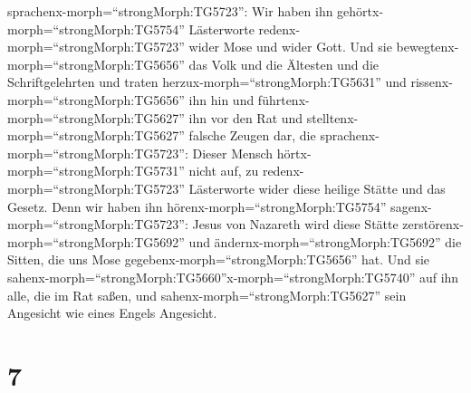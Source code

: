 sprachenx-morph=``strongMorph:TG5723'': Wir haben ihn
gehörtx-morph=``strongMorph:TG5754'' Lästerworte
redenx-morph=``strongMorph:TG5723'' wider Mose und wider Gott.
 Und sie bewegtenx-morph=``strongMorph:TG5656'' das Volk
und die Ältesten und die Schriftgelehrten und traten
herzux-morph=``strongMorph:TG5631'' und
rissenx-morph=``strongMorph:TG5656'' ihn hin und
führtenx-morph=``strongMorph:TG5627'' ihn vor den Rat  und
stelltenx-morph=``strongMorph:TG5627'' falsche Zeugen dar, die
sprachenx-morph=``strongMorph:TG5723'': Dieser Mensch
hörtx-morph=``strongMorph:TG5731'' nicht auf, zu
redenx-morph=``strongMorph:TG5723'' Lästerworte wider diese heilige
Stätte und das Gesetz.  Denn wir haben ihn
hörenx-morph=``strongMorph:TG5754'' sagenx-morph=``strongMorph:TG5723'':
Jesus von Nazareth wird diese Stätte
zerstörenx-morph=``strongMorph:TG5692'' und
ändernx-morph=``strongMorph:TG5692'' die Sitten, die uns Mose
gegebenx-morph=``strongMorph:TG5656'' hat.  Und sie
sahenx-morph=``strongMorph:TG5660''x-morph=``strongMorph:TG5740'' auf
ihn alle, die im Rat saßen, und sahenx-morph=``strongMorph:TG5627'' sein
Angesicht wie eines Engels Angesicht.

\hypertarget{section-6}{%
\section{7}\label{section-6}}


